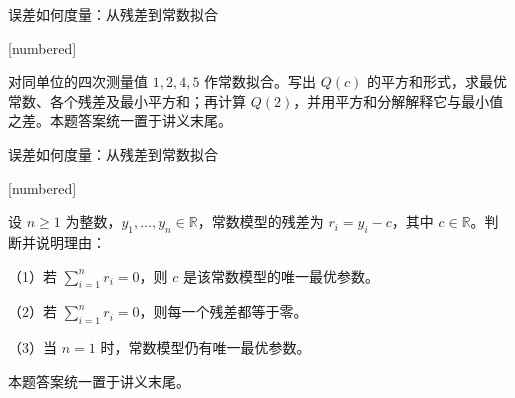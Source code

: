 \documentclass[aspectratio=169,10pt,fontset=fandol]{ctexbeamer}
\makeatletter
\newcommand{\mathagentexerciselabelcontext}[1]{%
\hypertarget<1>{#1}{}%
\edef\@currentHref{#1}%
}
\makeatother
\begin{document}
\begin{frame}[t,fragile]{误差如何度量：从残差到常数拟合}
\normalsize
{\normalsize
[numbered]
\mathagentexerciselabelcontext{mathagent.exercise.U0014.0}
\begin{exercise}
\label{mathagent:exercise:79e91357ee05b8b9aa4c657d553157f1ef411624d282c3f2337dd0e01453ce2d}
对同单位的四次测量值 $1,2,4,5$ 作常数拟合。写出 $Q(c)$ 的平方和形式，求最优常数、各个残差及最小平方和；再计算 $Q(2)$，并用平方和分解解释它与最小值之差。本题答案统一置于讲义末尾。
\end{exercise}
}
\end{frame}
\begin{frame}[t,fragile]{误差如何度量：从残差到常数拟合}
\normalsize
{\normalsize
[numbered]
\mathagentexerciselabelcontext{mathagent.exercise.U0015.0}
\begin{exercise}
\label{mathagent:exercise:9e7dbf7ef17df1506f236bbf1ad6ff8c14ff13065df89e12b796d18475228be7}
设 $n\geq1$ 为整数，$y_1,\ldots,y_n\in\mathbb{R}$，常数模型的残差为 $r_i=y_i-c$，其中 $c\in\mathbb{R}$。判断并说明理由：

（1）若 $\sum_{i=1}^{n}r_i=0$，则 $c$ 是该常数模型的唯一最优参数。

（2）若 $\sum_{i=1}^{n}r_i=0$，则每一个残差都等于零。

（3）当 $n=1$ 时，常数模型仍有唯一最优参数。

本题答案统一置于讲义末尾。
\end{exercise}
}
\end{frame}
\end{document}
